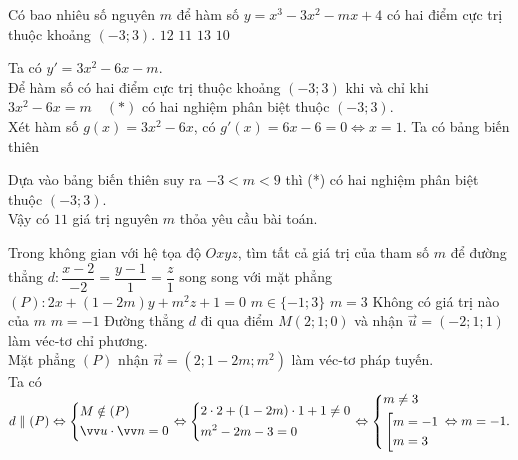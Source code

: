 \begin{ex}%
	Có bao nhiêu số nguyên $m$ để hàm số $y=x^3-3x^2-mx+4$ có hai điểm cực trị thuộc  khoảng $(-3;3)$.
	\choice
	{$12$}
	{\True $11$}
	{$13$}
	{$10$}
	\loigiai
	{Ta có $ y' = 3x^2-6x-m $. \\
		Để hàm số có hai điểm cực trị  thuộc khoảng $ \left(-3;3\right) $ khi và chỉ khi $ 3x^2-6x=m \quad (*)$ có hai nghiệm phân biệt thuộc $ \left(-3;3\right) $.\\
		Xét hàm số $ g(x) = 3x^2-6x $, có $ g'(x)=6x-6=0 \Leftrightarrow x = 1 $. Ta có bảng biến thiên
		\begin{center}
		\end{center}
		Dựa vào bảng biến thiên suy ra $ -3<m<9 $ thì (*) có hai nghiệm phân biệt thuộc $ \left(-3;3\right) $.\\
		Vậy có $ 11 $ giá trị nguyên $ m $ thỏa yêu cầu bài toán.}
\end{ex}
\begin{ex}%
	Trong không gian với hệ tọa độ $Oxyz$, tìm tất cả giá trị của tham số $m$ để đường thẳng $d\colon \dfrac{x-2}{-2}=\dfrac{y-1}{1}=\dfrac{z}{1}$ song song với mặt phẳng $(P)\colon 2x+(1-2m)y+m^2z+1=0$
	\choice
	{$m\in \{-1;3\}$}
	{$m=3$}
	{Không có giá trị nào của $m$}
	{\True $m=-1$}
	\loigiai
	{Đường thẳng $ d $ đi qua điểm $ M(2;1;0) $ và nhận $ \vec{u}=(-2;1;1) $ làm véc-tơ chỉ phương.\\
		Mặt phẳng $ (P) $ nhận $ \vec{n} = \left(2;1-2m;m^2\right) $ làm véc-tơ pháp tuyến.\\
		Ta có $ d \parallel (P)  \Leftrightarrow \heva{&M \notin (P)\\&\vec{u}\cdot \vec{n} = 0}\Leftrightarrow \heva{&2\cdot2+(1-2m)\cdot 1 + 1 \ne 0\\&m^2 - 2m - 3 = 0} \Leftrightarrow \heva{&m \ne 3\\ &\hoac{&m=-1\\&m=3}} \Leftrightarrow m = -1.$
	}
\end{ex}
